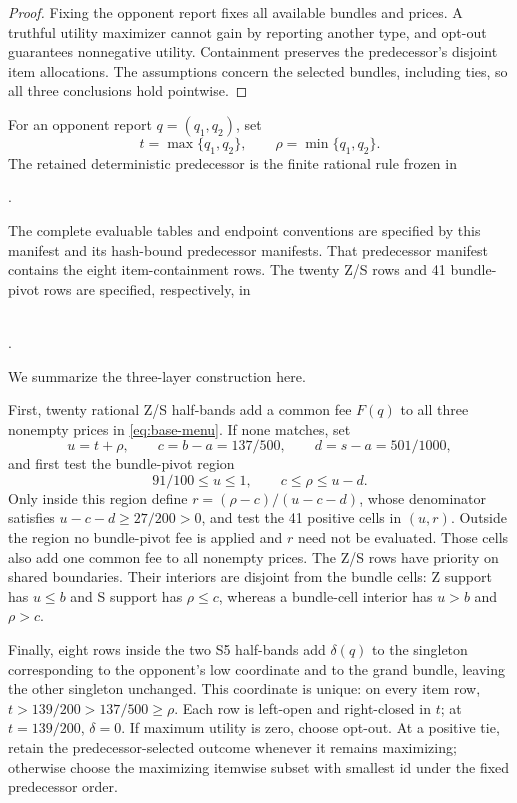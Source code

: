 \documentclass[11pt]{article}
\begin{document}
\begin{proof}
Fixing the opponent report fixes all available bundles and prices.  A
truthful utility maximizer cannot gain by reporting another type, and opt-out
guarantees nonnegative utility.  Containment preserves the predecessor's
disjoint item allocations.  The assumptions concern the selected bundles,
including ties, so all three conclusions hold pointwise.
\end{proof}

For an opponent report \(q=(q_1,q_2)\), set
\[
t=\max\{q_1,q_2\},\qquad \rho=\min\{q_1,q_2\}.
\]
The retained deterministic predecessor is the finite rational rule frozen in
\begin{center}
.
\end{center}
The complete evaluable tables and endpoint conventions are specified by this
manifest and its hash-bound predecessor manifests.  That predecessor manifest
contains the eight item-containment rows.  The twenty Z/S rows and 41
bundle-pivot rows are specified, respectively, in
\begin{center}\small
{}\\
.
\end{center}
We summarize the three-layer construction here.

First, twenty rational Z/S half-bands add a common fee \(F(q)\) to all three
nonempty prices in \eqref{eq:base-menu}.  If none matches, set
\[
u=t+\rho,\qquad c=b-a=137/500,\qquad d=s-a=501/1000,
\]
and first test the bundle-pivot region
\[
91/100\leq u\leq1,\qquad c\leq\rho\leq u-d.
\]
Only inside this region define \(r=(\rho-c)/(u-c-d)\), whose denominator
satisfies \(u-c-d\geq27/200>0\), and test the 41 positive cells in \((u,r)\).
Outside the region no bundle-pivot fee is applied and \(r\) need not be
evaluated.  Those cells also add one common fee to all nonempty prices.  The Z/S rows have
priority on shared boundaries.  Their interiors are disjoint from the bundle
cells: Z support has \(u\leq b\) and S support has \(\rho\leq c\), whereas a
bundle-cell interior has \(u>b\) and \(\rho>c\).

Finally, eight rows inside the two S5 half-bands add \(\delta(q)\) to the
singleton corresponding to the opponent's low coordinate and to the grand
bundle, leaving the other singleton unchanged.  This coordinate is unique:
on every item row, \(t>139/200>137/500\geq\rho\).  Each row is left-open and
right-closed in \(t\); at \(t=139/200\), \(\delta=0\).  If maximum utility is
zero, choose opt-out.  At a positive tie, retain the predecessor-selected
outcome whenever it remains maximizing; otherwise choose the maximizing
itemwise subset with smallest id under the fixed predecessor order.
\end{document}
